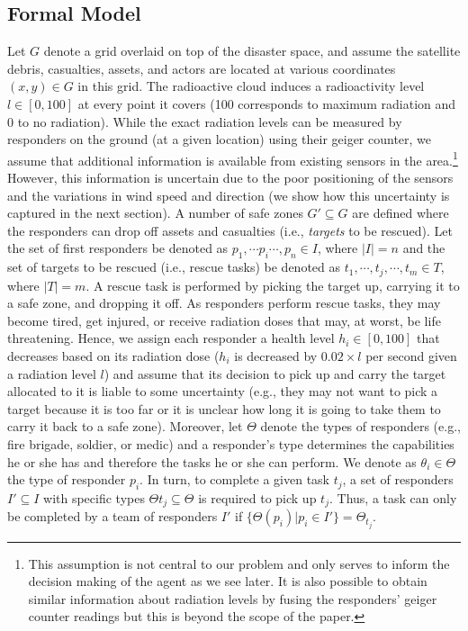 \subsection{Formal Model}
\noindent Let $G$ denote a grid overlaid on top of the disaster space, and assume the satellite debris, casualties, assets, and actors are located at various coordinates $(x,y) \in G$ in this grid. The radioactive cloud induces a radioactivity level  $l \in [0,100]$ at every point it covers (100 corresponds to maximum radiation and 0 to no radiation). While the exact radiation levels can be measured by responders on the ground (at a given location) using their geiger counter, we assume that additional information is available  from existing sensors  in the area.\footnote{This assumption is not central to our problem and only serves to inform the decision making of the agent as we see later. It is also possible to obtain similar information about radiation levels by fusing the responders' geiger counter readings but this is beyond the scope of the paper.} However, this information is uncertain due to the poor positioning of the sensors and the variations in wind speed and direction (we show how this uncertainty is captured in the next section). A number of safe zones $G' \subseteq G$ are defined where the responders can drop off assets and casualties (i.e., \emph{targets} to be rescued). Let the set of first responders be denoted as $p_1, \cdots p_i \cdots, p_n \in I$, where $|I| = n$ and the set of  targets to be rescued (i.e., rescue tasks) be denoted as  $t_1,\cdots, t_j, \cdots, t_m\in T$, where $|T| = m$. A rescue task is performed by picking the target up, carrying it to a safe zone, and dropping it off.  As responders perform rescue tasks, they may become tired, get injured, or receive radiation doses that may, at worst, be life threatening. Hence, we assign each responder  a health level $h_i\in [0,100]$ that decreases based on its radiation dose ($h_i$ is decreased by $0.02 \times l$ per second given a radiation level $l$) and assume that its decision to pick up and carry the target allocated to it is liable to some uncertainty (e.g., they may not want to pick a target because it is too far or it is unclear how long it is going to take them to  carry it back  to a safe zone).  Moreover, let $\Theta$ denote the types of responders (e.g., fire brigade, soldier, or medic)  and a responder's type determines the capabilities he or she has and therefore the tasks he or she can perform. We denote as $\theta_i \in \Theta$ the type of responder $p_i$. In turn, to complete a given task $t_j$,  a set of responders $I' \subseteq I$ with specific types $\Theta{t_j} \subseteq \Theta$ is required to pick up $t_j$. Thus, a task can only be completed by a team of responders $I'$ if $\{\Theta(p_i) | p_i \in I'\} = \Theta_{t_j}$.
%
